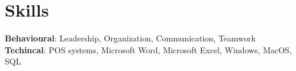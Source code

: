 \section{Skills}
 \begin{itemize}[leftmargin=0.15in, label={}]
    \small{\item{
      \textbf{Behavioural}{: Leadership, Organization, Communication, Teamwork} \\
     \textbf{Techincal}{: POS systems, Microsoft Word, Microsoft Excel, Windows, MacOS, SQL }\\
    }}
 \end{itemize}